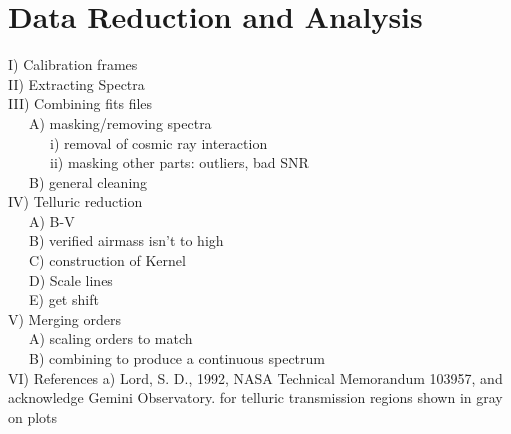 \section{Data Reduction and Analysis}

I) Calibration frames\\

II) Extracting Spectra\\

III) Combining fits files\\
~~~A) masking/removing spectra\\
~~~~~~i) removal of cosmic ray interaction\\
~~~~~~ii) masking other parts: outliers, bad SNR\\
~~~B) general cleaning\\

IV) Telluric reduction\\
~~~A) B-V\\
~~~B) verified airmass isn't to high\\
~~~C) construction of Kernel\\
~~~D) Scale lines\\
~~~E) get shift\\

V) Merging orders\\
~~~A) scaling orders to match\\
~~~B) combining to produce a continuous spectrum\\

VI) References
  a) Lord, S. D., 1992, NASA Technical Memorandum 103957, and acknowledge Gemini Observatory.
  for telluric transmission regions shown in gray on plots


